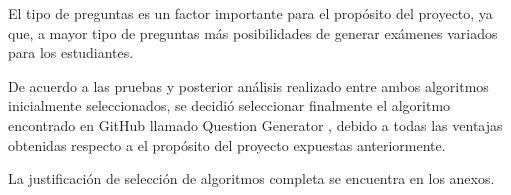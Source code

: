 \documentclass[../Main.tex]{subfiles}
\begin{document}
\begin{justify}
\begin{itemize}
    El tipo de preguntas es un factor importante para el propósito del proyecto, ya que, a mayor tipo de preguntas más posibilidades de generar exámenes variados para los estudiantes.
    
    De acuerdo a las pruebas y posterior análisis realizado entre ambos algoritmos inicialmente seleccionados, se decidió seleccionar finalmente el algoritmo encontrado en GitHub llamado Question Generator \cite{45}, debido a todas las ventajas obtenidas respecto a el propósito del proyecto expuestas anteriormente.
\end{itemize}

    La justificación de selección de algoritmos completa se encuentra en los anexos.
\end{justify}
\end{document}
